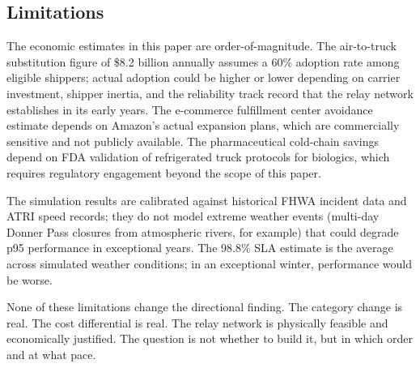\subsection*{Limitations}

The economic estimates in this paper are order-of-magnitude. The air-to-truck substitution
figure of \$8.2 billion annually assumes a 60\% adoption rate among eligible shippers;
actual adoption could be higher or lower depending on carrier investment, shipper inertia,
and the reliability track record that the relay network establishes in its early years.
The e-commerce fulfillment center avoidance estimate depends on Amazon's actual expansion
plans, which are commercially sensitive and not publicly available. The pharmaceutical
cold-chain savings depend on FDA validation of refrigerated truck protocols for biologics,
which requires regulatory engagement beyond the scope of this paper.

The simulation results are calibrated against historical FHWA incident data and ATRI
speed records; they do not model extreme weather events (multi-day Donner Pass closures
from atmospheric rivers, for example) that could degrade p95 performance in exceptional
years. The 98.8\% SLA estimate is the average across simulated weather conditions; in
an exceptional winter, performance would be worse.

None of these limitations change the directional finding. The category change is real.
The cost differential is real. The relay network is physically feasible and economically
justified. The question is not whether to build it, but in which order and at what pace.

